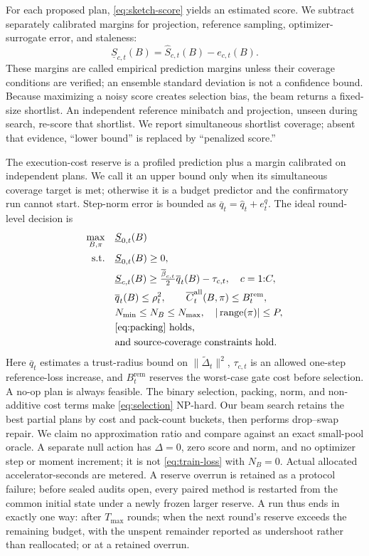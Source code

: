 \documentclass{article}
\begin{document}
For each proposed plan, \cref{eq:sketch-score} yields an estimated score. We
subtract separately calibrated margins for projection, reference sampling,
optimizer-surrogate error, and staleness:
\begin{equation}
\underline S_{c,t}(B)=\widehat S_{c,t}(B)-e_{c,t}(B).
\end{equation}
These margins are called empirical prediction margins unless their coverage
conditions are verified; an ensemble standard deviation is not a confidence
bound.
Because maximizing a noisy score creates selection bias, the beam returns a
fixed-size shortlist. An independent reference minibatch and projection,
unseen during search, re-score that shortlist. We report simultaneous
shortlist coverage; absent that evidence, ``lower bound'' is replaced by
``penalized score.''

The execution-cost reserve is a profiled prediction plus a margin calibrated
on independent plans. We call it an upper bound only when its simultaneous
coverage target is met; otherwise it is a budget predictor and the
confirmatory run cannot start. Step-norm error is bounded as
$\overline q_t=\widehat q_t+e_t^q$. The ideal round-level decision is
\begin{align}
\max_{B,\pi}\quad &\underline S_{0,t}(B) \label{eq:selection}\\
\text{s.t.}\quad
&\underline S_{0,t}(B)\ge0,\nonumber\\
&\underline S_{c,t}(B)\ge
\tfrac{\overline\beta_{c,t}}{2}\overline q_t(B)-\tau_{c,t},
\quad c=1{:}C,\nonumber\\
&\overline q_t(B)\le \rho_t^2,\qquad
\overline C_t^{\mathrm{all}}(B,\pi)\le B_t^{\mathrm{rem}},\nonumber\\
&N_{\min}\le N_B\le N_{\max},\quad
|\operatorname{range}(\pi)|\le P,\nonumber\\
&\text{\cref{eq:packing} holds,}\nonumber\\
&\text{and source-coverage constraints hold.}\nonumber
\end{align}
Here $\overline q_t$ estimates a trust-radius bound on
$\|\widetilde\Delta_t\|^2$, $\tau_{c,t}$ is an allowed one-step reference-loss
increase, and $B_t^{\mathrm{rem}}$ reserves the worst-case gate cost before
selection. A no-op plan is always feasible. The binary selection,
packing, norm, and non-additive cost terms make \cref{eq:selection} NP-hard.
Our beam search retains the best partial plans by cost and pack-count buckets,
then performs drop--swap repair. We claim no approximation ratio and compare
against an exact small-pool oracle.
A separate null action has $\Delta=0$, zero score and norm, and no optimizer
step or moment increment; it is not \cref{eq:train-loss} with $N_B=0$.
Actual allocated accelerator-seconds are metered. A reserve overrun is retained
as a protocol failure; before sealed audits open, every paired method is
restarted from the common initial state under a newly frozen larger reserve.
A run thus ends in exactly one way: after $T_{\max}$ rounds; when the next
round's reserve exceeds the remaining budget, with the unspent remainder
reported as undershoot rather than reallocated; or at a retained overrun.
\end{document}
